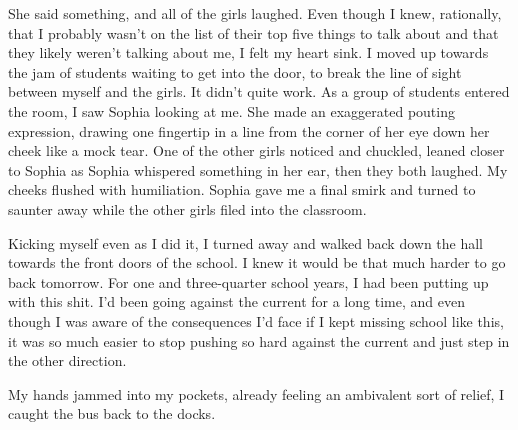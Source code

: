 She said something, and all of the girls laughed.  Even though I knew, rationally, that I probably wasn't on the list of their top five things to talk about and that they likely weren't talking about me, I felt my heart sink.  I moved up towards the jam of students waiting to get into the door, to break the line of sight between myself and the girls.  It didn't quite work.  As a group of students entered the room, I saw Sophia looking at me.  She made an exaggerated pouting expression, drawing one fingertip in a line from the corner of her eye down her cheek like a mock tear.  One of the other girls noticed and chuckled, leaned closer to Sophia as Sophia whispered something in her ear, then they both laughed.  My cheeks flushed with humiliation.  Sophia gave me a final smirk and turned to saunter away while the other girls filed into the classroom.



Kicking myself even as I did it, I turned away and walked back down the hall towards the front doors of the school.  I knew it would be that much harder to go back tomorrow.  For one and three-quarter school years, I had been putting up with this shit.  I'd been going against the current for a long time, and even though I was aware of the consequences I'd face if I kept missing school like this, it was so much easier to stop pushing so hard against the current and just step in the other direction.



My hands jammed into my pockets, already feeling an ambivalent sort of relief, I caught the bus back to the docks.





